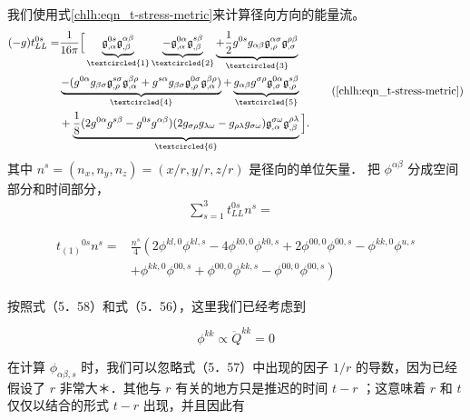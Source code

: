我们使用式\eqref{chlh:eqn_t-stress-metric}来计算径向方向的能量流。
\begin{equation}
	\begin{aligned}
		(-g)t_{LL}^{0s} =& \frac{1}{16\pi} \Big[
		\underbrace{\mathfrak{g}^{0 s}_{,\alpha}\mathfrak{g}^{\alpha \beta}_{,\beta} }_{\tiny \textcircled{1}}
		\underbrace{- \mathfrak{g}^{0 \alpha}_{,\alpha}\mathfrak{g}^{s \beta}_{,\beta} }_{\tiny \textcircled{2}}
		\underbrace{+\frac{1}{2}g^{0 s}g_{\alpha \beta}\mathfrak{g}^{\alpha \sigma}_{,\rho} 
			\mathfrak{g}^{\rho \beta}_{,\sigma}}_{\tiny \textcircled{3}} \\
		&\underbrace{-(g^{0 \alpha}g_{\beta \sigma}\mathfrak{g}^{s \sigma}_{,\rho}
			\mathfrak{g}^{\beta \rho}_{,\alpha}+g^{s \alpha}g_{\beta \sigma}
			\mathfrak{g}^{0 \sigma}_{,\rho}\mathfrak{g}^{\beta \rho}_{,\alpha})}_{\tiny \textcircled{4}} 
		+ \underbrace{g_{\alpha \beta}g^{\sigma \rho}\mathfrak{g}^{0 \alpha}_{,\sigma}
			\mathfrak{g}^{s \beta}_{,\rho}}_{\tiny \textcircled{5}} \\
		&+\underbrace{\frac{1}{8}(2g^{0 \alpha}g^{s \beta}-g^{0 s}g^{\alpha \beta})
			(2g_{\sigma \rho}g_{\lambda \omega}-g_{\rho \lambda}g_{\sigma \omega})
			\mathfrak{g}^{\sigma \omega}_{,\alpha}\mathfrak{g}^{\rho \lambda}_{,\beta}}_{\tiny \textcircled{6}}  \Big] .
	\end{aligned} \tag{\ref{chlh:eqn_t-stress-metric}}
\end{equation}
其中 $n^{s}=\left(n_{x}, n_{y}, n_{z}\right)=(x / r, y / r, z / r)$ 是径向的单位矢量．
把 $\phi^{\alpha \beta}$ 分成空间部分和时间部分，
\begin{align*}
	\sum_{s=1}^{3}t_{LL}^{0 s}n^s = &
\end{align*}

\begin{align*}
	t_{(1)}{ }^{0 s} n^{s}= & \frac{n^{s}}{4}\left(2 \phi^{k l, 0} \phi^{k l, s}-4 \phi^{k 0,0} \phi^{k 0, s}+2 \phi^{00,0} \phi^{00, s}-\phi^{k k, 0} \phi^{u, s}\right. \\
	& \left.+\phi^{k k, 0} \phi^{00, s}+\phi^{00,0} \phi^{k k, s}-\phi^{00,0} \phi^{00, s}\right) \tag{5.60}
\end{align*}


按照式（5．58）和式（5．56），这里我们已经考虑到

$$
\phi^{k k} \propto \ddot{Q}^{k k}=0
$$

在计算 $\phi_{\alpha \beta, s}$ 时，我们可以忽略式（5．57）中出现的因子 $1 / r$ 的导数，因为已经假设了 $r$ 非常大＊．其他与 $r$ 有关的地方只是推迟的时间 $t-r$ ；这意味着 $r$ 和 $t$ 仅仅以结合的形式 $t-r$ 出现，并且因此有


